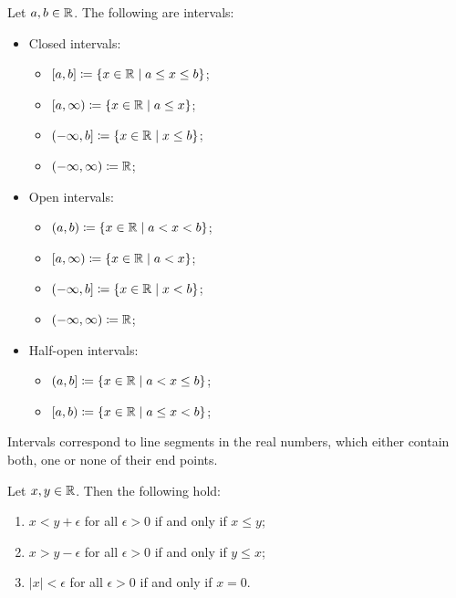 \begin{definition}
  Let \(a, b \in \mathbb{R}\). The following are intervals:
  \begin{itemize}
  \item Closed intervals:
    \begin{itemize}
    \item \([a,b] \coloneqq \{x \in \mathbb{R} \mid a \leq x \leq b\}\);
    \item \([a, \infty) \coloneqq \{x \in \mathbb{R} \mid a \leq x\}\);
    \item \((-\infty, b] \coloneqq \{x \in \mathbb{R} \mid x \leq b\}\);
    \item \((-\infty, \infty) \coloneqq \mathbb{R}\);
    \end{itemize}

  \item Open intervals:
    \begin{itemize}
    \item \((a,b) \coloneqq \{x \in \mathbb{R} \mid a < x < b\}\);
    \item \([a, \infty) \coloneqq \{x \in \mathbb{R} \mid a < x\}\);
    \item \((-\infty, b] \coloneqq \{x \in \mathbb{R} \mid x < b\}\);
    \item \((-\infty, \infty) \coloneqq \mathbb{R}\);
    \end{itemize}

  \item Half-open intervals:
    \begin{itemize}
    \item \((a,b] \coloneqq \{x \in \mathbb{R} \mid a < x \leq b\}\);
    \item \([a,b) \coloneqq \{x \in \mathbb{R} \mid a \leq x < b\}\);
    \end{itemize}
  \end{itemize}
\end{definition}

Intervals correspond to line segments in the real numbers, which either contain both, one or none of their end points.

\begin{theorem}
  Let \(x, y \in \mathbb{R}\). Then the following hold:
  \begin{enumerate}
    \item \(x < y + \epsilon\) for all \(\epsilon > 0\) if and only if \(x \leq y\);
    \item \(x > y - \epsilon\) for all \(\epsilon > 0\) if and only if \(y \leq x\);
    \item \(|x| < \epsilon\) for all \(\epsilon > 0\) if and only if \(x = 0\).
  \end{enumerate}
\end{theorem}

